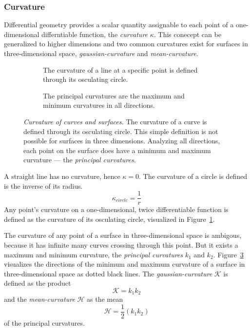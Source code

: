 \subsubsection{Curvature}

Differential geometry provides a scalar quantity\cite{Kuhnel2008} assignable to each point of a one-dimensional differntiable function, the \emph{\gls{curvature}} $\kappa$.
This conecept can be generalized to higher dimensions and two common \glspl{curvature} exist for surfaces in three-dimensional space, \emph{\gls{gaussian-curvature}} and \emph{\gls{mean-curvature}}.
\begin{figure}[H]
    \begin{subfigure}[t]{0.48\textwidth}
        \centering
        \scalebox{0.85}{%
        
        }
        \caption{The \gls{curvature} of a line at a specific point is defined through its osculating circle.}\label{fig:osculating_circle}
    \end{subfigure}\hfill%
    \begin{subfigure}[t]{0.48\textwidth}
        \centering
        \scalebox{0.85}{%
        
        }
        \caption{The principal curvatures are the maximum and minimum \glspl{curvature} in all directions.}\label{fig:curvature_surface}
    \end{subfigure}
    \caption[Curvature of curves and surfaces]{\emph{Curvature of curves and surfaces.} The \gls{curvature} of a curve is defined through its osculating circle. This simple definition is not possible for surfaces in three dimensions. Analyzing all directions, each point on the surface does have a minimum and maximum \gls{curvature} --- the \emph{principal curvatures}.}
\end{figure}
A straight line has no \gls{curvature}, hence $\kappa = 0$.
The \gls{curvature} of a circle is defined is the inverse of its radius.
\begin{equation}
    \kappa_{circle} = \frac{1}{r}
\end{equation}
Any point's \gls{curvature} on a one-dimensional, twice differentiable function is defined as the \gls{curvature} of its osculating circle, visualized in Figure~\ref{fig:osculating_circle}.

The \gls{curvature} of any point of a surface in three-dimensional space is ambigous, because it has infinite many curves crossing through this point.
But it exists a maximum and minimum \gls{curvature}, the \emph{principal curvatures} $k_1$ and $k_2$.
Figure~\ref{fig:curvature_surface} visualizes the directions of the minimum and maximum \gls{curvature} of a surface in three-dimensional space as dotted black lines.
The \emph{\Gls{gaussian-curvature}} $\mathcal{K}$ is defined as the product
\[
    \mathcal{K} = k_1 k_2
\]
and the \emph{\Gls{mean-curvature}} $\mathcal{H}$ as the mean
\[
    \mathcal{H} = \frac{1}{2} (k_1 k_2)
\]
of the principal curvatures.

